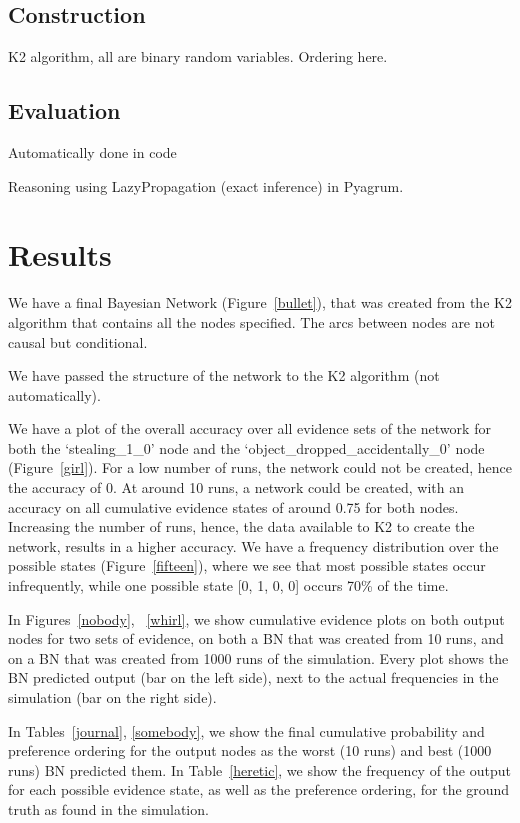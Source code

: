 \documentclass[12pt]{article}
\begin{document}
\subsection{Construction}
K2 algorithm,  all are binary random variables. Ordering here.



\subsection{Evaluation}
Automatically done in code

Reasoning using LazyPropagation (exact inference) in Pyagrum.




\newpage

\section{Results}



We have a final Bayesian Network (Figure~\ref{bullet}), that was created from the K2 algorithm that contains all the nodes specified. The arcs between nodes are not causal but conditional. 

We have passed the structure of the network to the K2 algorithm (not automatically). 


We have a plot of the overall accuracy over all evidence sets of the network for both the `stealing\_1\_0' node and the `object\_dropped\_accidentally\_0' node (Figure~\ref{girl}). For a low number of runs, the network could not be created, hence the accuracy of 0. At around 10 runs, a network could be created, with an accuracy on all cumulative evidence states of around 0.75 for both nodes. Increasing the number of runs, hence, the data available to K2 to create the network, results in a higher accuracy. We have a frequency distribution over the possible states (Figure~\ref{fifteen}), where we see that most possible states occur infrequently, while one possible state [0, 1, 0, 0] occurs 70\% of the time. 

In Figures~\ref{nobody}, ~\ref{whirl}, we show cumulative evidence plots on both output nodes for two sets of evidence, on both a BN that was created from 10 runs, and on a BN that was created from 1000 runs of the simulation. Every plot shows the BN predicted output (bar on the left side), next to the actual frequencies in the simulation (bar on the right side).

In Tables~\ref{journal}, \ref{somebody}, we show the final cumulative probability and preference ordering for the output nodes as the worst (10 runs) and best (1000 runs) BN predicted them. In Table~\ref{heretic}, we show the frequency of the output for each possible evidence state, as well as the preference ordering, for the ground truth as found in the simulation.
\end{document}
